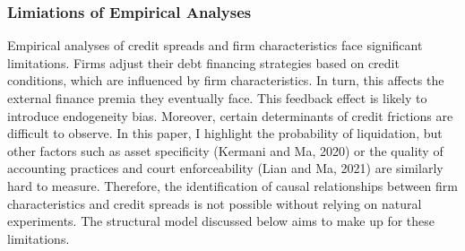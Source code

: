 \documentclass[12pt]{article}
\begin{document}
\subsubsection{Limiations of Empirical Analyses \label{sec:credit spreads}} 
Empirical analyses of credit spreads and firm characteristics face significant limitations. Firms adjust their debt financing strategies based on credit conditions, which are influenced by firm characteristics. In turn, this affects the external finance premia they eventually face. This feedback effect is likely to introduce endogeneity bias. Moreover, certain determinants of credit frictions are difficult to observe. In this paper, I highlight the probability of liquidation, but other factors such as asset specificity (Kermani and Ma, 2020) or the quality of accounting practices and court enforceability (Lian and Ma, 2021) are similarly hard to measure. Therefore, the identification of causal relationships between firm characteristics and credit spreads is not possible without relying on natural experiments. The structural model discussed below aims to make up for these limitations. 
\end{document}
